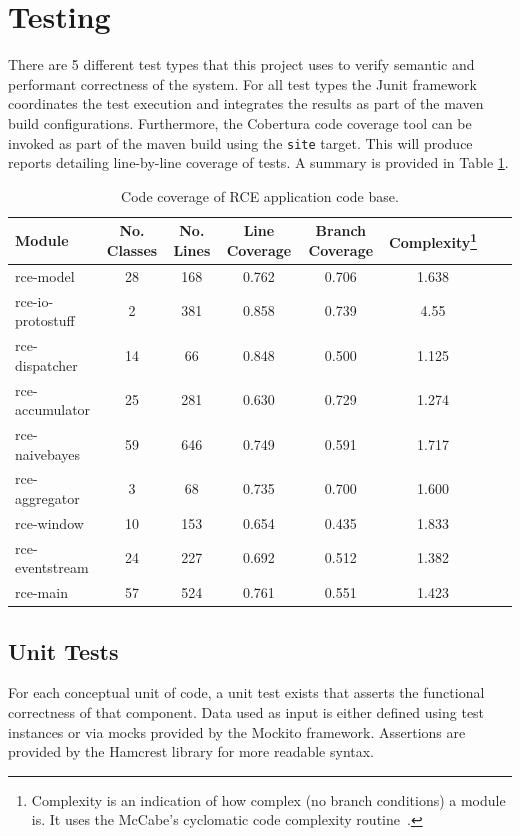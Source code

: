 \documentclass[a4paper,11pt]{scrreprt}
\begin{document}
\section{Testing}
There are 5 different test types that this project uses to verify semantic and performant correctness of the system. For all test types the Junit framework coordinates the test execution and integrates the results as part of the maven build configurations. Furthermore, the Cobertura code coverage tool can be invoked as part of the maven build using the \verb|site| target. This will produce reports detailing line-by-line coverage of tests. A summary is provided in Table \ref{tab:coverage}.
\begin{table}[h!]
\begin{tabular}{l*{6}{c}r}
Module              & No. Classes & No. Lines & Line Coverage & Branch Coverage & Complexity\footnote{Complexity is an indication of how complex (no branch conditions) a module is. It uses the McCabe's cyclomatic code complexity routine~\cite{mccabecc}.} \\
\hline
rce-model & 28 & 168 & 0.762 & 0.706 & 1.638 \\
rce-io-protostuff & 2 & 381 & 0.858 & 0.739 & 4.55 \\
rce-dispatcher & 14 & 66 & 0.848 & 0.500 & 1.125 \\
rce-accumulator & 25 & 281 & 0.630 & 0.729 & 1.274 \\
rce-naivebayes & 59 & 646 & 0.749 & 0.591 & 1.717 \\
rce-aggregator & 3 & 68 & 0.735 & 0.700 & 1.600 \\
rce-window & 10 & 153 & 0.654 & 0.435 & 1.833 \\
rce-eventstream & 24 & 227 & 0.692 & 0.512 & 1.382 \\
rce-main & 57 & 524 & 0.761 & 0.551 & 1.423 \\
\end{tabular}
\caption{Code coverage of RCE application code base.}
\label{tab:coverage}
\end{table}

\subsection{Unit Tests}
For each conceptual unit of code, a unit test exists that asserts the functional correctness of that component. Data used as input is either defined using test instances or via mocks provided by the Mockito framework. Assertions are provided by the Hamcrest library for more readable syntax.
\end{document}
